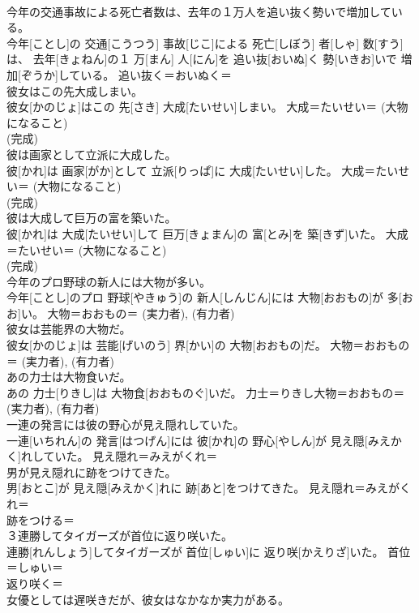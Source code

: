 \documentclass[8pt]{extreport}
\begin{document}
\begin{CJK}{UTF8}{min}
{\\	今年の交通事故による死亡者数は、去年の１万人を追い抜く勢いで増加している。	
\\	今年[ことし]の 交通[こうつう] 事故[じこ]による 死亡[しぼう] 者[しゃ] 数[すう]は、 去年[きょねん]の１ 万[まん] 人[にん]を 追い抜[おいぬ]く 勢[いきお]いで 増加[ぞうか]している。	追い抜く＝おいぬく＝ 
\\	彼女はこの先大成しまい。	
\\	彼女[かのじょ]はこの 先[さき] 大成[たいせい]しまい。	大成＝たいせい＝ (大物になること) 
\\	(完成)
\\	彼は画家として立派に大成した。	
\\	彼[かれ]は 画家[がか]として 立派[りっぱ]に 大成[たいせい]した。	大成＝たいせい＝ (大物になること) 
\\	(完成)
\\	彼は大成して巨万の富を築いた。	
\\	彼[かれ]は 大成[たいせい]して 巨万[きょまん]の 富[とみ]を 築[きず]いた。	大成＝たいせい＝ (大物になること) 
\\	(完成)
\\	今年のプロ野球の新人には大物が多い。	
\\	今年[ことし]のプロ 野球[やきゅう]の 新人[しんじん]には 大物[おおもの]が 多[おお]い。	大物＝おおもの＝ (実力者), (有力者) 
\\	彼女は芸能界の大物だ。	
\\	彼女[かのじょ]は 芸能[げいのう] 界[かい]の 大物[おおもの]だ。	大物＝おおもの＝ (実力者), (有力者) 
\\	あの力士は大物食いだ。	
\\	あの 力士[りきし]は 大物食[おおものぐ]いだ。	力士＝りきし大物＝おおもの＝ (実力者), (有力者) 
\\	一連の発言には彼の野心が見え隠れしていた。	
\\	一連[いちれん]の 発言[はつげん]には 彼[かれ]の 野心[やしん]が 見え隠[みえかく]れしていた。	見え隠れ＝みえがくれ＝ 
\\	男が見え隠れに跡をつけてきた。	
\\	男[おとこ]が 見え隠[みえかく]れに 跡[あと]をつけてきた。	見え隠れ＝みえがくれ＝ 
\\	跡をつける＝ 
\\	３連勝してタイガーズが首位に返り咲いた。	
\\	連勝[れんしょう]してタイガーズが 首位[しゅい]に 返り咲[かえりざ]いた。	首位＝しゅい＝ 
\\	返り咲く＝ 
\\	女優としては遅咲きだが、彼女はなかなか実力がある。	
}
\end{CJK}
\end{document}
